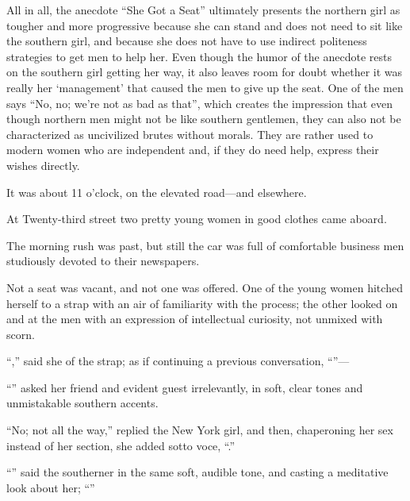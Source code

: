 All in all, the anecdote “She Got a Seat” ultimately presents the northern girl as tougher and more progressive because she can stand and does not need to sit like the southern girl, and because she does not have to use indirect politeness strategies to get men to help her. Even though the humor of the anecdote rests on the southern girl getting her way, it also leaves room for doubt whether it was really her ‘management’ that caused the men to give up the seat. One of the men says “No, no; we’re not as bad as that”, which creates the impression that even though northern men might not be like southern gentlemen, they can also not be characterized as uncivilized brutes without morals. They are rather used to modern women who are independent and, if they do need help, express their wishes directly.

\begin{ipquote}
\begin{center}
\end{center}
It was about 11 o’clock, on the elevated road—and elsewhere.

At Twenty-third street two pretty young women in good clothes came aboard.

The morning rush was past, but still the car was full of comfortable business men studiously devoted to their newspapers.

Not a seat was vacant, and not one was offered. One of the young women hitched herself to a strap with an air of familiarity with the process; the other looked on and at the men with an expression of intellectual curiosity, not unmixed with scorn.

“,” said she of the strap; as if continuing a previous conversation, “”—

“” asked her friend and evident guest irrelevantly, in soft, clear tones and unmistakable southern accents.

“No; not all the way,” replied the New York girl, and then, chaperoning her sex instead of her section, she added sotto voce, “.”

“” said the southerner in the same soft, audible tone, and casting a meditative look about her; “”


\end{ipquote}
